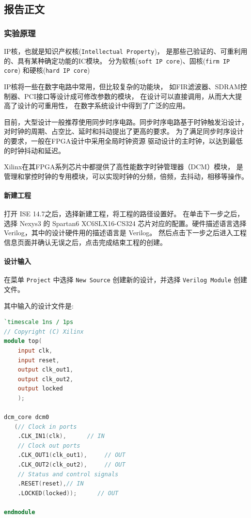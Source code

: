 \documentclass{ctexart}
\begin{document}
        \subsection{报告正文}

        \subsubsection{实验原理}

        IP核，也就是知识产权核(\verb|Intellectual Property|)，
        是那些己验证的、可重利用的、具有某种确定功能的IC模块。
        分为软核(\verb|soft IP core|)、固核(\verb|firm IP core|)
        和硬核(\verb|hard IP core|)

        IP核将一些在数字电路中常用，但比较复杂的功能块，
        如FIR滤波器、SDRAM控制器、PCI接口等设计成可修改参数的模块，
        在设计可以直接调用，从而大大提高了设计的可重用性，
        在数字系统设计中得到了广泛的应用。

        目前，大型设计一般推荐使用同步时序电路。同步时序电路基于时钟触发沿设计，
        对时钟的周期、占空比、延时和抖动提出了更高的要求。
        为了满足同步时序设计的要求，一般在FPGA设计中采用全局时钟资源
        驱动设计的主时钟，以达到最低的时钟抖动和延迟。
       
        Xilinx在其FPGA系列芯片中都提供了高性能数字时钟管理器（DCM）模块，
        是管理和掌控时钟的专用模块，可以实现时钟的分频，倍频，去抖动，相移等操作。

        \paragraph{新建工程}

        打开 ISE 14.7之后，选择新建工程，将工程的路径设置好。
        在单击下一步之后，选择 Nexys3 的 Spartan6 XC6SLX16-CS324 芯片对应的配置。硬件描述语言选择 Verilog，其中的设计硬件用的描述语言是 Verilog。
        然后点击下一步之后进入工程信息页面并确认无误之后，点击完成结束工程的创建。

        \paragraph{设计输入}

        在菜单 \verb|Project| 中选择 \verb|New Source| 创建新的设计，并选择 \verb|Verilog Module| 创建文件。

        其中输入的设计文件是:
        \begin{lstlisting}[language=Verilog]
`timescale 1ns / 1ps
// Copyright (C) Xilinx
module top(
    input clk,
    input reset,
    output clk_out1,
    output clk_out2,
    output locked
    );
	 
dcm_core dcm0
   (// Clock in ports
    .CLK_IN1(clk),      // IN
    // Clock out ports
    .CLK_OUT1(clk_out1),     // OUT
    .CLK_OUT2(clk_out2),     // OUT
    // Status and control signals
    .RESET(reset),// IN
    .LOCKED(locked));      // OUT

endmodule
        \end{lstlisting}
\end{document}
